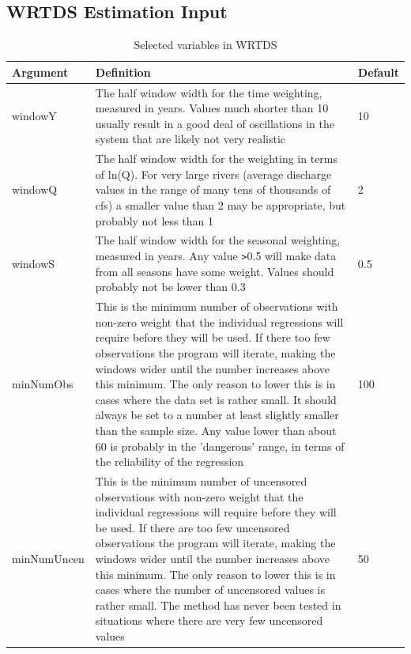 \documentclass[a4paper,11pt]{article}\usepackage[]{graphicx}\usepackage[]{color}
\begin{document}
\subsection{WRTDS Estimation Input}
\label{sec:wrtdsInputVariables}
\begin{table}[ht]
\caption{Selected variables in WRTDS  \label{tab:WRTDS}}
\begin{tabularx}{\textwidth}{lXl}
\hline
  \textbf{Argument} & \textbf{Definition} & \textbf{Default} \\
\hline
windowY & The half window width for the time weighting, measured in years.  Values much shorter than 10 usually result in a good deal of oscillations in the system that are likely not very realistic & 10\\
windowQ & The half window width for the weighting in terms of ln(Q).  For very large rivers (average discharge values in the range of many tens of thousands of cfs) a smaller value than 2 may be appropriate, but probably not less than 1 & 2 \\
windowS & The half window width for the seasonal weighting, measured in years.  Any value \texttt{>}0.5 will make data from all seasons have some weight.  Values should probably not be lower than 0.3 & 0.5 \\
minNumObs & This is the minimum number of observations with non-zero weight that the individual regressions will require before they will be used.  If there too few observations the program will iterate, making the windows wider until the number increases above this minimum.  The only reason to lower this is in cases where the data set is rather small.  It should always be set to a number at least slightly smaller than the sample size.  Any value lower than about 60 is probably in the 'dangerous' range, in terms of the reliability of the regression & 100 \\ 
minNumUncen & This is the minimum number of uncensored observations with non-zero weight that the individual regressions will require before they will be used.  If there are too few uncensored observations the program will iterate, making the windows wider until the number increases above this minimum.  The only reason to lower this is in cases where the number of uncensored values is rather small.  The method has never been tested in situations where there are very few uncensored values & 50 \\
\hline
\end{tabularx}

\end{table}
\end{document}
